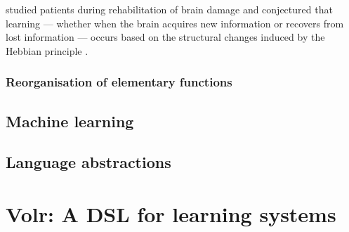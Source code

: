 \documentclass[a4paper,oneside]{memoir}
\begin{document}
\autocite{Robertson1999} studied patients during
rehabilitation of brain damage and conjectured that learning --- whether when the
brain acquires new information or recovers from lost information --- occurs based
on the structural changes induced by the Hebbian principle
\autocite{Robertson1999}.

\autocite{Mogensen2011}

\subsubsection{Reorganisation of elementary functions}

\subsection{Machine learning}

\subsection{Language abstractions}

\section{Volr: A DSL for learning systems}
\label{volr}

\clearpage

\printglossary

\printbibliography
\end{document}
